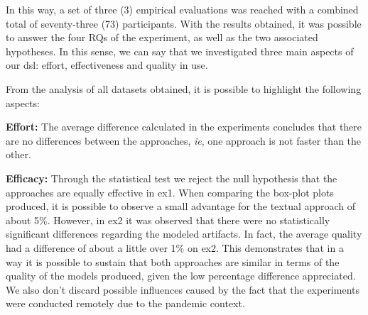 In this way, a set of three (3) empirical evaluations was reached with a combined total of seventy-three (73) participants.
With the results obtained, it was possible to answer the four RQs of the experiment, as well as the two associated hypotheses.
In this sense, we can say that we investigated three main aspects of our \ac{dsl}: effort, effectiveness and quality in use.

From the analysis of all datasets obtained, it is possible to highlight the following aspects:

\item \textbf{Effort:} The average difference calculated in the experiments concludes that there are no differences between the approaches, \textit{ie}, one approach is not faster than the other.

\item \textbf{Efficacy:} Through the statistical test we reject the null hypothesis that the approaches are equally effective in \ac{ex1}.
When comparing the box-plot plots produced, it is possible to observe a small advantage for the textual approach of about 5\%.
However, in \ac{ex2} it was observed that there were no statistically significant differences regarding the modeled artifacts.
In fact, the average quality had a difference of about a little over 1\% on \ac{ex2}.
This demonstrates that in a way it is possible to sustain that both approaches are similar in terms of the quality of the models produced, given the low percentage difference appreciated.
We also don’t discard possible influences caused by the fact that the experiments were conducted remotely due to the pandemic context.

